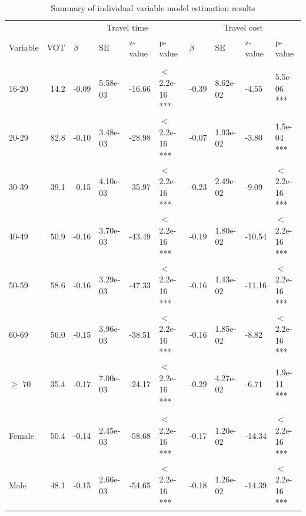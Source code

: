 \documentclass[numbered]{trbunofficial}\usepackage[]{graphicx}\usepackage[]{color}
\begin{document}
\begin{table}[H]
\centering
\caption{Summary of individual variable model estimation results}
\label{tab:regresults}
\begingroup\fontsize{8}{10}\selectfont

\begin{tabular}{lrllllllll}
\toprule
\multicolumn{2}{c}{ } & \multicolumn{4}{c}{Travel time} & \multicolumn{4}{c}{Travel cost} \\
\cmidrule(l{3pt}r{3pt}){3-6} \cmidrule(l{3pt}r{3pt}){7-10}
Variable & VOT & $\beta$ & SE & z-value & p-value & $\beta$ & SE & z-value & p-value\\
\midrule
\addlinespace[0.3em]
\multicolumn{10}{l}{\textbf{Age model, $McFadden~R^2 = 0.54$}}\\
\hline
\hspace{1em}16-20 & 14.2 & -0.09 & 5.58e-03 & -16.66 & $<$ 2.2e-16 *** & -0.39 & 8.62e-02 & -4.55 & 5.5e-06 ***\\
\hspace{1em}20-29 & 82.8 & -0.10 & 3.48e-03 & -28.98 & $<$ 2.2e-16 *** & -0.07 & 1.93e-02 & -3.80 & 1.5e-04 ***\\
\hspace{1em}30-39 & 39.1 & -0.15 & 4.10e-03 & -35.97 & $<$ 2.2e-16 *** & -0.23 & 2.49e-02 & -9.09 & $<$ 2.2e-16 ***\\
\hspace{1em}40-49 & 50.9 & -0.16 & 3.70e-03 & -43.49 & $<$ 2.2e-16 *** & -0.19 & 1.80e-02 & -10.54 & $<$ 2.2e-16 ***\\
\hspace{1em}50-59 & 58.6 & -0.16 & 3.29e-03 & -47.33 & $<$ 2.2e-16 *** & -0.16 & 1.43e-02 & -11.16 & $<$ 2.2e-16 ***\\
\hspace{1em}60-69 & 56.0 & -0.15 & 3.96e-03 & -38.51 & $<$ 2.2e-16 *** & -0.16 & 1.85e-02 & -8.82 & $<$ 2.2e-16 ***\\
\hspace{1em}$\geq$ 70 & 35.4 & -0.17 & 7.00e-03 & -24.17 & $<$ 2.2e-16 *** & -0.29 & 4.27e-02 & -6.71 & 1.9e-11 ***\\
\addlinespace[0.3em]
\multicolumn{10}{l}{\textbf{Gender, $McFadden~R^2 = 0.53$}}\\
\hline
\hspace{1em}Female & 50.4 & -0.14 & 2.45e-03 & -58.68 & $<$ 2.2e-16 *** & -0.17 & 1.20e-02 & -14.34 & $<$ 2.2e-16 ***\\
\hspace{1em}Male & 48.1 & -0.15 & 2.66e-03 & -54.65 & $<$ 2.2e-16 *** & -0.18 & 1.26e-02 & -14.39 & $<$ 2.2e-16 ***\\

\end{tabular}
\end{table}
\end{document}
